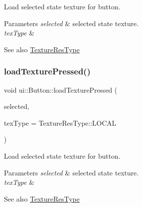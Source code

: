 Load selected state texture for button.


\begin{DoxyParams}{Parameters}
{\em selected} & selected state texture. \\
\hline
{\em tex\+Type} & \\
\hline
\end{DoxyParams}
\begin{DoxySeeAlso}{See also}
{\ttfamily \hyperlink{classui_1_1Widget_a040a65ec5ad3b11119b7e16b98bd9af0}{Texture\+Res\+Type}} 
\end{DoxySeeAlso}
\mbox{\label{classui_1_1Button_afe8edbced5e469eae002fbb813b8d924}} 
\subsubsection{\texorpdfstring{load\+Texture\+Pressed()}{loadTexturePressed()}\hspace{0.1cm}{\footnotesize\ttfamily [2/2]}}
{\footnotesize\ttfamily void ui\+::\+Button\+::load\+Texture\+Pressed (\begin{DoxyParamCaption}\item[{const std\+::string \&}]{selected,  }\item[{\hyperlink{classui_1_1Widget_a040a65ec5ad3b11119b7e16b98bd9af0}{Texture\+Res\+Type}}]{tex\+Type = {\ttfamily TextureResType\+:\+:LOCAL} }\end{DoxyParamCaption})}

Load selected state texture for button.


\begin{DoxyParams}{Parameters}
{\em selected} & selected state texture. \\
\hline
{\em tex\+Type} & \\
\hline
\end{DoxyParams}
\begin{DoxySeeAlso}{See also}
{\ttfamily \hyperlink{classui_1_1Widget_a040a65ec5ad3b11119b7e16b98bd9af0}{Texture\+Res\+Type}} 
\end{DoxySeeAlso}
\mbox{\label{classui_1_1Button_ae1e65a90ed37f0bf962b73eda1067e34}} 
